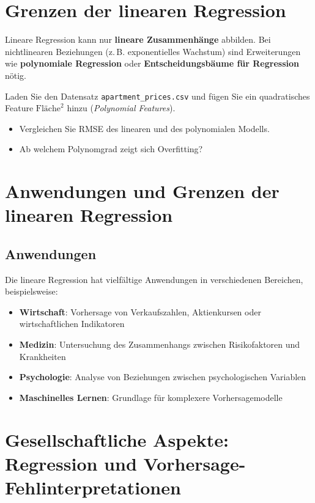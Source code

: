 \section{Grenzen der linearen Regression}

\begin{mycaution}
Lineare Regression kann nur \textbf{lineare Zusammenhänge} abbilden.
Bei nichtlinearen Beziehungen (z.\,B. exponentielles Wachstum) sind Erweiterungen wie
\textbf{polynomiale Regression} oder \textbf{Entscheidungsbäume für Regression} nötig.
\end{mycaution}

\begin{mychallenge}
Laden Sie den Datensatz \texttt{apartment\_prices.csv} und fügen Sie ein quadratisches
Feature $\text{Fläche}^2$ hinzu (\emph{Polynomial Features}).
\begin{itemize}
    \item Vergleichen Sie RMSE des linearen und des polynomialen Modells.
    \item Ab welchem Polynomgrad zeigt sich Overfitting?
\end{itemize}
\end{mychallenge}

\section{Anwendungen und Grenzen der linearen Regression}

\subsection{Anwendungen}

Die lineare Regression hat vielfältige Anwendungen in verschiedenen Bereichen, beispielsweise:

\begin{itemize}
	\item \textbf{Wirtschaft}: Vorhersage von Verkaufszahlen, Aktienkursen oder wirtschaftlichen Indikatoren
	\item \textbf{Medizin}: Untersuchung des Zusammenhangs zwischen Risikofaktoren und Krankheiten
	\item \textbf{Psychologie}: Analyse von Beziehungen zwischen psychologischen Variablen
	\item \textbf{Maschinelles Lernen}: Grundlage für komplexere Vorhersagemodelle
\end{itemize}

\section[Gesellschaftliche Aspekte: Regression und Vorhersage-Fehlinterpretationen]{Gesellschaftliche Aspekte:\\ Regression und Vorhersage-Fehlinterpretationen}

